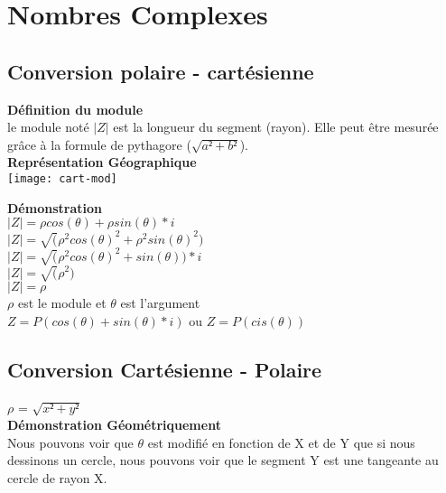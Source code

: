 \newpage
\chapter{Nombres Complexes}
\vspace{3mm} %
\section{Conversion polaire - cartésienne}
\vspace{3mm} %

\textbf{Définition du module} \\

le module noté $|Z|$ est la longueur du segment (rayon). Elle peut être mesurée  grâce à la formule de pythagore ($\sqrt{a²+b²}$). \\


\vspace{5mm} %
\textbf{Représentation Géographique} \\

\texttt{[image: cart-mod]}

\textbf{Démonstration}\\

$|Z| = \rho cos(\theta)+ \rho sin(\theta) *i$ \\
$|Z| = \sqrt(\rho^{2} cos(\theta)^{2}+ \rho^{2} sin(\theta)^{2})$ \\
$|Z| = \sqrt(\rho^{2} cos(\theta)^{2}+ sin(\theta))*i $ \\
$|Z| = \sqrt(\rho^{2}) $ \\
$|Z| = \rho $ \\

$\rho$ est le module et $\theta$ est l'argument \\
$Z = P(cos(\theta) + sin(\theta)*i )$ ou $Z= P(cis(\theta))$\\

\newpage

\section{Conversion Cartésienne - Polaire}
\vspace{3mm} %

$\rho$ = $\sqrt{x²+y²}$ \\

\textbf{Démonstration Géométriquement} \\

Nous pouvons voir que $\theta$ est modifié en fonction de X et de Y que si nous dessinons un cercle, nous pouvons voir que le segment Y est une tangeante au cercle de rayon X. \\

